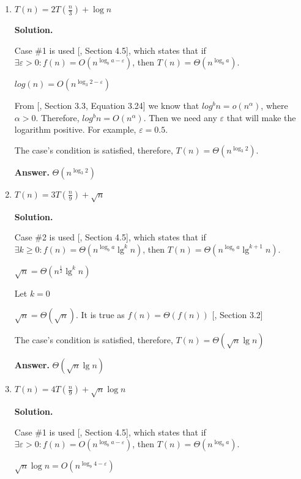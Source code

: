 \documentclass{article}
\begin{document}
\begin{enumerate}
    \begin{enumerate}
        \item $T(n) = 2T(\frac{n}{3}) + \log{n}$

        \textbf{Solution.}

        Case \#1 is used [, Section 4.5], which states that if $\exists \varepsilon > 0: f(n) = O(n^{\log_b{a-\varepsilon}})$, then $T(n) = \Theta(n^{\log_b{a}})$.

        $log(n) = O(n^{\log_3{2-\varepsilon}})$

        From [, Section 3.3, Equation 3.24] we know that $log^b{n} = o(n^\alpha)$, where $\alpha > 0$. Therefore, $log^b{n} = O(n^\alpha)$. Then we need any $\varepsilon$ that will make the logarithm positive. For example, $\varepsilon = 0.5$.

        The case's condition is satisfied, therefore, $T(n) = \Theta(n^{\log_3{2}})$.
        
        \textbf{Answer.} $\Theta(n^{\log_3{2}})$
        
        \item $T(n) = 3T(\frac{n}{9}) + \sqrt{n}$

        \textbf{Solution.}

        Case \#2 is used [, Section 4.5], which states that if $\exists k \geq 0: f(n) = \Theta(n^{\log_b{a}}\lg^k{n})$, then $T(n) = \Theta(n^{\log_b{a}}\lg^{k+1}{n})$.
    
        $\sqrt{n} = \Theta(n^\frac{1}{2}\lg^k{n})$
    
        Let $k = 0$
    
        $\sqrt{n} = \Theta(\sqrt{n})$. It is true as $f(n) = \Theta(f(n))$ [, Section 3.2]
    
        The case's condition is satisfied, therefore, $T(n) = \Theta(\sqrt{n}\lg{n})$
        
        \textbf{Answer.} $\Theta(\sqrt{n}\lg{n})$
        
        \item $T(n) = 4T(\frac{n}{9}) + \sqrt{n}\log{n}$

        \textbf{Solution.}

        Case \#1 is used [, Section 4.5], which states that if $\exists \varepsilon > 0: f(n) = O(n^{\log_b{a-\varepsilon}})$, then $T(n) = \Theta(n^{\log_b{a}})$.

        $\sqrt{n}\log{n} = O(n^{\log_9{4-\varepsilon}})$


\end{enumerate}
\end{enumerate}
\end{document}
